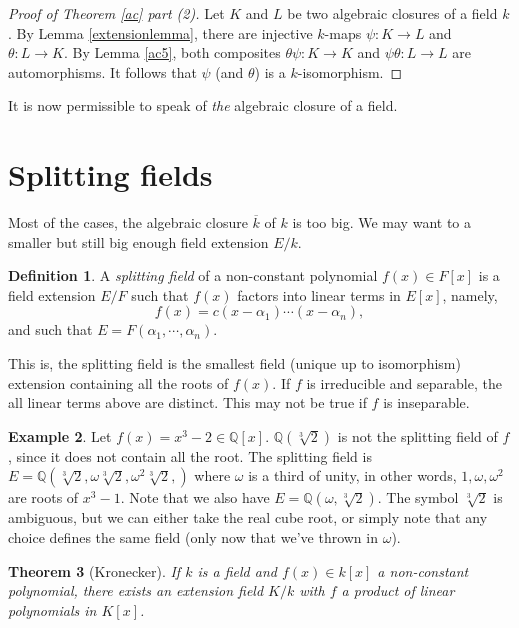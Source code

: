 \documentclass[12pt]{report}
\newtheorem{theorem}{Theorem}[section]
\theoremstyle{definition}
\newtheorem{definition}[theorem]{Definition}
\newtheorem{example}[theorem]{Example}
\newcommand{\QQ}{\mathbb{Q}}
\begin{document}
\begin{proof}[Proof of Theorem \ref{ac} part (2)]
	Let $K$ and $L$ be two algebraic closures of a field $k$. By Lemma \ref{extensionlemma}, there are injective $k$-maps $\psi : K \to L$ and $\theta : L \to K$. By Lemma \ref{ac5}, both composites $\theta \psi : K \to K$ and $\psi \theta : L \to L$ are automorphisms. It follows that $\psi$ (and $\theta$) is a $k$-isomorphism.
\end{proof}

It is now permissible to speak of \emph{the} algebraic closure of a field.

\section{Splitting fields}

Most of the cases, the algebraic closure $\overline{k}$ of $k$ is too big. We may want to a smaller but still big enough field extension $E/k$.

\begin{definition}
	A \emph{splitting field} of a non-constant polynomial $f(x)\in F[x]$ is a field extension $E/F$ such that $f(x)$ factors into linear terms in $E[x]$, namely, $$f(x)=c(x-\alpha_1)\cdots(x-\alpha_n),$$
	and such that $E=F(\alpha_1,\cdots,\alpha_n)$.
\end{definition}

This is, the splitting field is the smallest field (unique up to isomorphism) extension containing all the roots of $f(x)$. If $f$ is irreducible and separable, the all linear terms above are distinct. This may not be true if $f$ is inseparable.

\begin{example}
	Let $f(x)=x^3-2\in\QQ[x]$. $\QQ(\sqrt[3]{2})$ is not the splitting field of $f$, since it does not contain all the root. The splitting field is $E=\QQ(\sqrt[3]{2},\omega\sqrt[3]{2},\omega^2\sqrt[3]{2},)$ where $\omega$ is a third of unity, in other words, $1,\omega,\omega^2$ are roots of $x^3-1$. Note that we also have $E=\QQ(\omega,\sqrt[3]{2})$. The symbol $\sqrt[3]{2}$ is ambiguous, but we can either take the real cube root, or simply note that any choice defines the same field (only now that we've thrown in $\omega$).
\end{example}

\begin{theorem}[Kronecker]
	If $k$ is a field and $f(x)\in k[x]$ a non-constant polynomial, there exists an extension field $K/k$ with $f$ a product of linear polynomials in $K[x]$.
\end{theorem}
\end{document}

